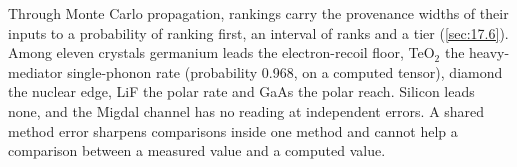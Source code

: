 Through Monte Carlo propagation, rankings carry the provenance widths of their inputs to a probability of ranking first, an interval of ranks and a tier (\cref{sec:17.6}). Among eleven crystals germanium leads the electron-recoil floor, TeO$_2$ the heavy-mediator single-phonon rate (probability 0.968, on a computed tensor), diamond the nuclear edge, LiF the polar rate and GaAs the polar reach. Silicon leads none, and the Migdal channel has no reading at independent errors. A shared method error sharpens comparisons inside one method and cannot help a comparison between a measured value and a computed value.
